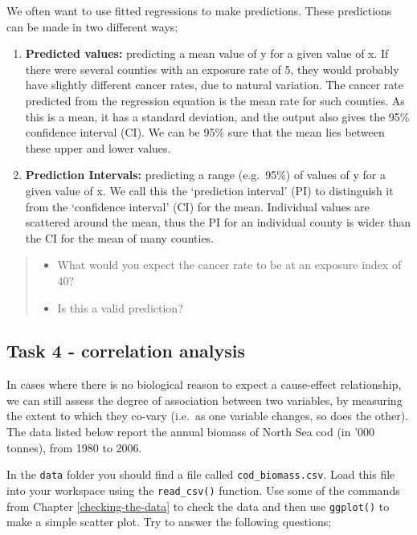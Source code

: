 \documentclass[
]{book}
\providecommand{\tightlist}{%
  \setlength{\itemsep}{0pt}\setlength{\parskip}{0pt}}
\begin{document}
We often want to use fitted regressions to make predictions. These predictions can be made in two different ways;

\begin{enumerate}
\def\labelenumi{\arabic{enumi})}
\tightlist
\item
  \textbf{Predicted values:} predicting a mean value of y for a given value of x. If there were several counties with an exposure rate of 5, they would probably have slightly different cancer rates, due to natural variation. The cancer rate predicted from the regression equation is the mean rate for such counties. As this is a mean, it has a standard deviation, and the output also gives the 95\% confidence interval (CI). We can be 95\% sure that the mean lies between these upper and lower values.
\item
  \textbf{Prediction Intervals:} predicting a range (e.g.~95\%) of values of y for a given value of x. We call this the `prediction interval' (PI) to distinguish it from the `confidence interval' (CI) for the mean. Individual values are scattered around the mean, thus the PI for an individual county is wider than the CI for the mean of many counties.
\end{enumerate}

\begin{quote}
\begin{itemize}
\tightlist
\item
  What would you expect the cancer rate to be at an exposure index of 40?
\item
  Is this a valid prediction?
\end{itemize}
\end{quote}

\hypertarget{task-4---correlation-analysis}{%
\subsection*{Task 4 - correlation analysis}\label{task-4---correlation-analysis}}

In cases where there is no biological reason to expect a cause-effect relationship, we can still assess the degree of association between two variables, by measuring the extent to which they co-vary (i.e.~as one variable changes, so does the other). The data listed below report the annual biomass of North Sea cod (in '000 tonnes), from 1980 to 2006.

In the \texttt{data} folder you should find a file called \texttt{cod\_biomass.csv}. Load this file into your workspace using the \texttt{read\_csv()} function. Use some of the commands from Chapter \ref{checking-the-data} to check the data and then use \texttt{ggplot()} to make a simple scatter plot. Try to answer the following questions;
\end{document}
